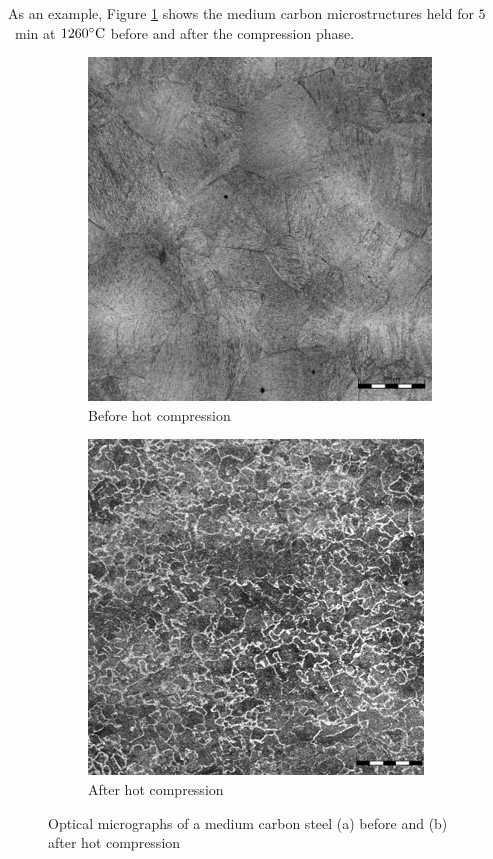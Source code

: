 \documentclass[twoside,english,1p,final,sort&compress]{elsarticle}
\theoremstyle{plain}
\begin{document}
As an example, Figure \ref{fig:Micrography} shows the medium carbon microstructures held for $5$~min at $1260\celsius$ before and after the compression phase.
\begin{figure}[!ht]
\centering
\begin{subfigure}[b]{0.45\columnwidth}
\centering
\includegraphics[width=\columnwidth]{Figures/BeforeCompM}
\caption{Before hot compression}
\end{subfigure}
\hfill
\begin{subfigure}[b]{0.45\columnwidth}
\centering
\includegraphics[width=\columnwidth]{Figures/AfterCompM}
\caption{After hot compression}
\end{subfigure}
\caption{Optical micrographs of a medium carbon steel (a) before and (b) after hot compression}
\label{fig:Micrography}
\end{figure}
\end{document}
